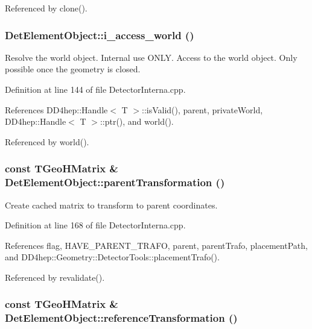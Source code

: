 Referenced by clone().\hypertarget{class_d_d4hep_1_1_geometry_1_1_det_element_object_af8e12445511be14deaedd157bd8ddbd6}{
\subsubsection[{i\_\-access\_\-world}]{ DetElementObject::i\_\-access\_\-world ()}}
\label{class_d_d4hep_1_1_geometry_1_1_det_element_object_af8e12445511be14deaedd157bd8ddbd6}


Resolve the world object. Internal use ONLY. Access to the world object. Only possible once the geometry is closed. 

Definition at line 144 of file DetectorInterna.cpp.

References DD4hep::Handle$<$ T $>$::isValid(), parent, privateWorld, DD4hep::Handle$<$ T $>$::ptr(), and world().

Referenced by world().\hypertarget{class_d_d4hep_1_1_geometry_1_1_det_element_object_a9db522499c3fbe2f11ae195cfd4f5e03}{
\subsubsection[{parentTransformation}]{\setlength{\rightskip}{0pt plus 5cm}const TGeoHMatrix \& DetElementObject::parentTransformation ()}}
\label{class_d_d4hep_1_1_geometry_1_1_det_element_object_a9db522499c3fbe2f11ae195cfd4f5e03}


Create cached matrix to transform to parent coordinates. 

Definition at line 168 of file DetectorInterna.cpp.

References flag, HAVE\_\-PARENT\_\-TRAFO, parent, parentTrafo, placementPath, and DD4hep::Geometry::DetectorTools::placementTrafo().

Referenced by revalidate().\hypertarget{class_d_d4hep_1_1_geometry_1_1_det_element_object_a728e600b6e565f6fb2174e36422ef1bc}{
\subsubsection[{referenceTransformation}]{\setlength{\rightskip}{0pt plus 5cm}const TGeoHMatrix \& DetElementObject::referenceTransformation ()}}
\label{class_d_d4hep_1_1_geometry_1_1_det_element_object_a728e600b6e565f6fb2174e36422ef1bc}


